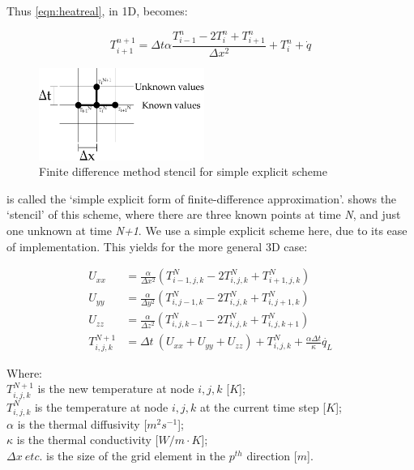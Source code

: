 Thus \cref{eqn:heatreal}, in 1D, becomes:

\begin{equation}
T_{i+1}^{n+1} =  \Delta t\alpha \frac{T_{i-1}^n-2T_i^n+T_{i+1}^n}{\Delta x^2} + T_i^n + \dot{q}
\label{eqn:simplefdm}
\end{equation}

\begin{figure}
  \begin{center}
    \includegraphics[width=0.48\textwidth]{./ablation/images/fdm-stencil.pdf}
  \end{center}
  \caption{Finite difference method stencil for simple explicit scheme}\label{fig:fdmstencil}
    \vspace{-20pt}
\end{figure}

 is called the `simple explicit form of finite-difference approximation'\cite{ozisik1994finite}.  shows the `stencil' of this scheme, where there are three known points at time \textit{N}, and just one unknown at time \textit{N+1}. We use a simple explicit scheme here, due to its ease of implementation. This yields for the more general 3D case:


\begin{align}
U_{xx} &= \frac{\alpha}{\Delta x^2} (T^N_{i-1,j,k} - 2T^N_{i,j,k} + T^N_{i+1,j,k}) \label{eqn:FDMheat1}\\
U_{yy} &= \frac{\alpha}{\Delta y^2} (T^N_{i,j-1,k} - 2T^N_{i,j,k} + T^N_{i,j+1,k}) \label{eqn:FDMheat2}\\
U_{zz} &= \frac{\alpha}{\Delta z^2} (T^N_{i,j,k-1} - 2T^N_{i,j,k} + T^N_{i,j,k+1}) \label{eqn:FDMheat3}\\
T^{N+1}_{i,j,k} &= \Delta t\ (U_{xx} + U_{yy} + U_{zz}) + T^{N}_{i,j,k} + \tfrac{\alpha \Delta t}{\kappa}\dot{q_L} \label{eqn:FDMheat4}
\end{align}

\noindent Where:\\
	\indent $T^{N+1}_{i,j,k}$ is the new temperature at node $i,j,k$ [$K$];\\
	\indent $T^N_{i,j,k}$ is the temperature at node $i,j,k$ at the current time step [$K$];\\
	\indent $\alpha$ is the thermal diffusivity [$m^2 s^{-1}$];\\
	\indent $\kappa$ is the thermal conductivity [$W/m\cdot K$];\\
	\indent $\Delta x\ etc.$ is the size of the grid element in the $p^{th}$ direction [$m$].\\

